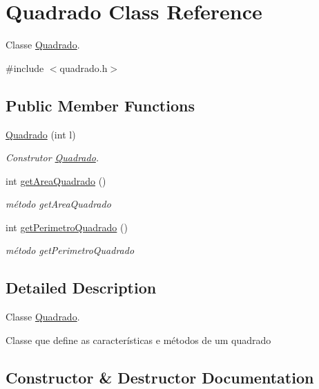 \hypertarget{classQuadrado}{}\section{Quadrado Class Reference}
\label{classQuadrado}


Classe \hyperlink{classQuadrado}{Quadrado}.  




{\ttfamily \#include $<$quadrado.\+h$>$}

\subsection*{Public Member Functions}
\begin{DoxyCompactItemize}
\item 
\hyperlink{classQuadrado_a7861fee5a133251e739e3c02633738da}{Quadrado} (int l)
\begin{DoxyCompactList}\small\item\em Construtor \hyperlink{classQuadrado}{Quadrado}. \end{DoxyCompactList}\item 
int \hyperlink{classQuadrado_a701664a9c69caf919cd842b28a9f0c48}{get\+Area\+Quadrado} ()
\begin{DoxyCompactList}\small\item\em método get\+Area\+Quadrado \end{DoxyCompactList}\item 
int \hyperlink{classQuadrado_a40397e4325a8455e4b2944a343743213}{get\+Perimetro\+Quadrado} ()
\begin{DoxyCompactList}\small\item\em método get\+Perimetro\+Quadrado \end{DoxyCompactList}\end{DoxyCompactItemize}


\subsection{Detailed Description}
Classe \hyperlink{classQuadrado}{Quadrado}. 

Classe que define as características e métodos de um quadrado 

\subsection{Constructor \& Destructor Documentation}
